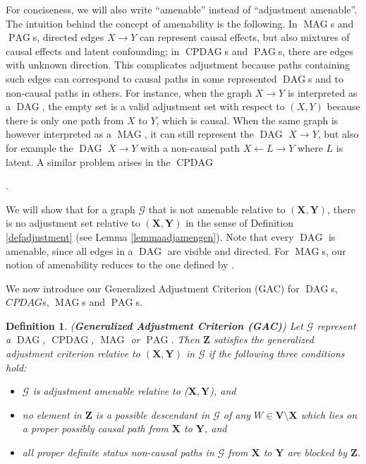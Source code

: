 \documentclass[]{article}
\DeclareMathOperator{\CPDAG}{CPDAG}
\DeclareMathOperator{\DAG}{DAG}
\DeclareMathOperator{\MAG}{MAG}
\DeclareMathOperator{\PAG}{PAG}
\newtheorem{definition}[theorem]{Definition}
\theoremstyle{definition}
\theoremstyle{remark}
\newcommand{\vars}[1][V]{\mathbf{#1}}
\newcommand{\g}[1][G]{\mathcal{#1}}
\begin{document}
For conciseness, we will also write ``amenable'' instead of ``adjustment amenable''. The intuition behind the concept of amenability is the following. In $\MAG$s and $\PAG$s, directed edges $X\to Y$ can represent causal effects, but also mixtures of causal effects and latent confounding; in $\CPDAG$s and $\PAG$s, there are edges with unknown direction. This complicates adjustment because paths containing such edges can correspond to causal paths in some represented $\DAG$s and to non-causal paths in others.
For instance, when the graph $X \to Y$ is interpreted as a $\DAG$, the empty set is a valid adjustment set with respect to $(X,Y)$ because there is only one path from $X$ to $Y$, which is causal. When the same graph is however interpreted as a $\MAG$, it can still represent the $\DAG$ $X \to Y$, but also for example the $\DAG$ $X\to Y$ with a non-causal path $X \leftarrow L \to Y$ where $L$ is latent. A similar problem arises in the $\CPDAG$ .

We will show that for a graph $\g$ that is not amenable relative to $(\mathbf{X,Y})$, there is no adjustment set relative to $(\mathbf{X,Y})$ in the sense of Definition \ref{defadjustment} (see Lemma \ref{lemmaadjamengen}). Note that every $\DAG$ is amenable, since all edges in a $\DAG$ are visible and directed. For $\MAG$s, our notion of amenability reduces to the one defined by \citet{vanconstructing}.

We now introduce our Generalized Adjustment Criterion (GAC) for $\DAG$s, $CPDAG$s, $\MAG$s and $\PAG$s.

\begin{definition}{(\textbf{Generalized Adjustment Criterion (GAC)})}
   Let $\g$ represent a $\DAG$, $\CPDAG$, $\MAG$ or $\PAG$. Then $\mathbf{Z}$ satisfies the generalized adjustment criterion
      relative to $(\mathbf{X,Y})$ in $\g$ if the following three conditions hold:
   \begin{itemize}
   \item[(0)] $\g$ is adjustment amenable relative to ($\mathbf{X,Y}$), and
   \item[(1)] no element in $\mathbf{Z}$ is a possible descendant in $\g$ of any $W \in \vars\setminus\mathbf{X}$ which lies on a proper possibly causal path from $\mathbf{X}$ to $\mathbf{Y}$, and
   \item[(2)] all proper definite status non-causal paths in $\g$ from $\mathbf{X}$ to $\mathbf{Y}$ are blocked by $\mathbf{Z}$.
   \end{itemize}
   \label{defacgen}
\end{definition}
\end{document}

